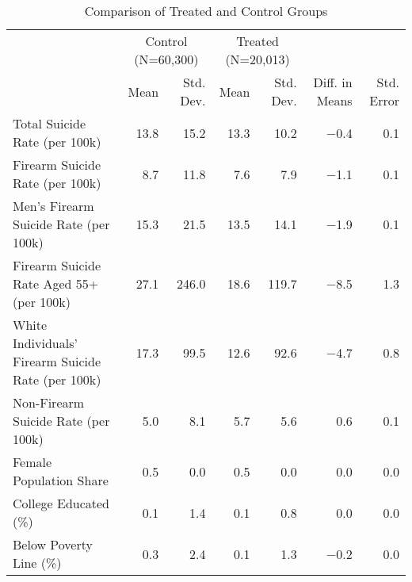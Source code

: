 \begin{table}
\centering
\caption{Comparison of Treated and Control Groups}
\centering
\begin{tabular}[t]{lrrrrrr}
\toprule
\multicolumn{1}{c}{ } & \multicolumn{2}{c}{Control (N=60,300)} & \multicolumn{2}{c}{Treated (N=20,013)} & \multicolumn{2}{c}{ } \\
\cmidrule(l{3pt}r{3pt}){2-3} \cmidrule(l{3pt}r{3pt}){4-5}
  & Mean & Std. Dev. & Mean & Std. Dev. & Diff. in Means & Std. Error\\
\midrule
Total Suicide Rate (per 100k) & \num{13.8} & \num{15.2} & \num{13.3} & \num{10.2} & \num{-0.4} & \num{0.1}\\
Firearm Suicide Rate (per 100k) & \num{8.7} & \num{11.8} & \num{7.6} & \num{7.9} & \num{-1.1} & \num{0.1}\\
Men's Firearm Suicide Rate (per 100k) & \num{15.3} & \num{21.5} & \num{13.5} & \num{14.1} & \num{-1.9} & \num{0.1}\\
Firearm Suicide Rate Aged 55+ (per 100k) & \num{27.1} & \num{246.0} & \num{18.6} & \num{119.7} & \num{-8.5} & \num{1.3}\\
White Individuals' Firearm Suicide Rate (per 100k) & \num{17.3} & \num{99.5} & \num{12.6} & \num{92.6} & \num{-4.7} & \num{0.8}\\
Non-Firearm Suicide Rate (per 100k) & \num{5.0} & \num{8.1} & \num{5.7} & \num{5.6} & \num{0.6} & \num{0.1}\\
Female Population Share & \num{0.5} & \num{0.0} & \num{0.5} & \num{0.0} & \num{0.0} & \num{0.0}\\
College Educated (\%) & \num{0.1} & \num{1.4} & \num{0.1} & \num{0.8} & \num{0.0} & \num{0.0}\\
Below Poverty Line (\%) & \num{0.3} & \num{2.4} & \num{0.1} & \num{1.3} & \num{-0.2} & \num{0.0}\\
\bottomrule
\end{tabular}
\end{table}
